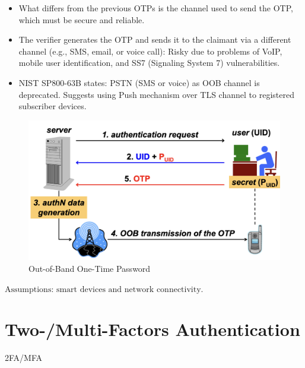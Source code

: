 \begin{multicols}{2}

    \begin{itemize}
        \item What differs from the previous OTPs is the channel used to send the OTP, which must be secure and reliable.
        \item The verifier generates the OTP and sends it to the claimant via a different channel (e.g., SMS, email, or voice call): Risky due to problems of VoIP, mobile user identification, and SS7 (Signaling System 7) vulnerabilities.
        \item NIST SP800-63B states: PSTN (SMS or voice) as OOB channel is deprecated. Suggests using Push mechanism over TLS channel to registered subscriber devices.
    \end{itemize}
\columnbreak

    \begin{figure}[H]
        \centering
        \includegraphics[width=\linewidth]{Images/Authentication/OOBotp.png}
        \caption{Out-of-Band One-Time Password}
    \end{figure}
\end{multicols}
\( \text{Assumptions: smart devices and network connectivity.} \)

\section{Two-/Multi-Factors Authentication}
\begin{center}
    2FA/MFA
\end{center}

